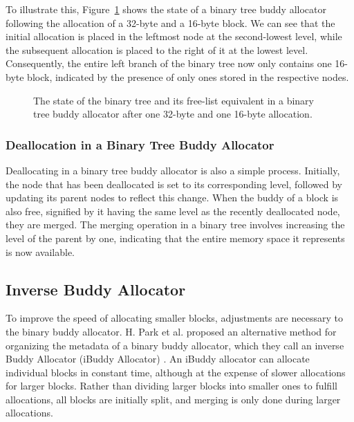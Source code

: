 To illustrate this, Figure~\ref{fig:btbudydallocated} shows the state of a binary tree buddy allocator following the allocation of a 32-byte and a 16-byte block. We can see that the initial allocation is placed in the leftmost node at the second-lowest level, while the subsequent allocation is placed to the right of it at the lowest level. Consequently, the entire left branch of the binary tree now only contains one 16-byte block, indicated by the presence of only ones stored in the respective nodes.

\begin{figure}[H]
    \centering
    
    \caption{The state of the binary tree and its free-list equivalent in a binary tree buddy allocator after one 32-byte and one 16-byte allocation.}
    \label{fig:btbudydallocated}
\end{figure}

\subsubsection{Deallocation in a Binary Tree Buddy Allocator}
Deallocating in a binary tree buddy allocator is also a simple process. Initially, the node that has been deallocated is set to its corresponding level, followed by updating its parent nodes to reflect this change. When the buddy of a block is also free, signified by it having the same level as the recently deallocated node, they are merged. The merging operation in a binary tree involves increasing the level of the parent by one, indicating that the entire memory space it represents is now available.

\subsection{Inverse Buddy Allocator}

To improve the speed of allocating smaller blocks, adjustments are necessary to the binary buddy allocator. H. Park et al. proposed an alternative method for organizing the metadata of a binary buddy allocator, which they call an inverse Buddy Allocator (iBuddy Allocator) \cite{park2014ibuddy}. An iBuddy allocator can allocate individual blocks in constant time, although at the expense of slower allocations for larger blocks. Rather than dividing larger blocks into smaller ones to fulfill allocations, all blocks are initially split, and merging is only done during larger allocations.


